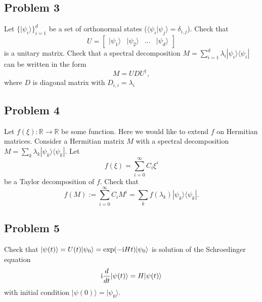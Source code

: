 \documentclass[a4paper,10pt]{article}
\newcommand{\ket}[1]{|#1\rangle}
\newcommand{\bra}[1]{\langle#1|}
\begin{document}
\subsection*{Problem 3}
Let $\{\ket{\psi_i}\}_{i=1}^d$ be a set of orthonormal states ($\bra{\psi_i}\psi_j\rangle=\delta_{i,j}$).
Check that
\begin{equation}
	U = \begin{bmatrix}
		\ket{\psi_1} & \ket{\psi_2} & \ldots & \ket{\psi_d}
	\end{bmatrix}
\end{equation}
is a unitary matrix.
Check that a spectral decomposition $M=\sum_{i=1}^d\lambda_i\ket{\psi_i}\bra{\psi_i}$ can be written in the form
\begin{equation}
	M = UDU^{\dagger},
\end{equation}
where $D$ is diagonal matrix with $D_{i,i}=\lambda_i$

\subsection*{Problem 4}
Let $f(\xi): \mathbb{R}\rightarrow \mathbb{R}$ be some function.
Here we would like to extend $f$ on Hermitian matrices.
Consider a Hermitian matrix $M$ with a spectral decomposition $M=\sum_k \lambda_k \ket{\psi_k}\bra{\psi_k}$.
Let
\begin{equation}
	f(\xi) = \sum_{i=0}^{\infty}C_i\xi^i 
\end{equation}
be a Taylor decomposition of $f$.
Check that
\begin{equation}
	f(M) := \sum_{i=0}^{\infty}C_iM^i= \sum_k f(\lambda_k) \ket{\psi_k}\bra{\psi_k}.
\end{equation}

\subsection*{Problem 5}
Check that $\ket{\psi(t)}=U(t)\ket{\psi_0}=\exp({-{\rm i}Ht})\ket{\psi_0}$ is solution of the Schroedinger equation
\begin{equation}
	{\rm i}\frac{d}{dt}\ket{\psi(t)}=H\ket{\psi(t)}
\end{equation}
with initial condition $\ket{\psi(0)}=\ket{\psi_0}$.
\end{document}
